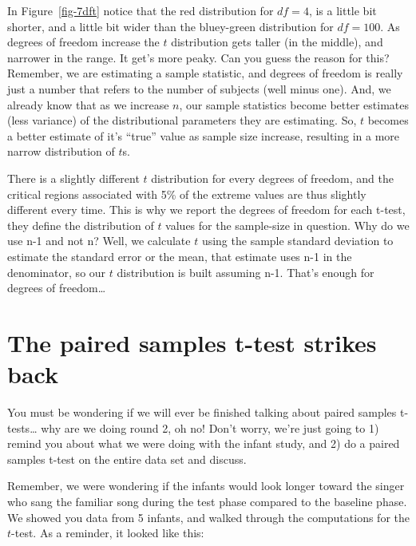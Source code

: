 \documentclass[
  letterpaper,
  DIV=11,
  numbers=noendperiod]{scrreprt}
\begin{document}
In Figure~\ref{fig-7dft} notice that the red distribution for
\(df = 4\), is a little bit shorter, and a little bit wider than the
bluey-green distribution for \(df = 100\). As degrees of freedom
increase the \(t\) distribution gets taller (in the middle), and
narrower in the range. It get's more peaky. Can you guess the reason for
this? Remember, we are estimating a sample statistic, and degrees of
freedom is really just a number that refers to the number of subjects
(well minus one). And, we already know that as we increase \(n\), our
sample statistics become better estimates (less variance) of the
distributional parameters they are estimating. So, \(t\) becomes a
better estimate of it's ``true'' value as sample size increase,
resulting in a more narrow distribution of \(t\)s.

There is a slightly different \(t\) distribution for every degrees of
freedom, and the critical regions associated with 5\% of the extreme
values are thus slightly different every time. This is why we report the
degrees of freedom for each t-test, they define the distribution of
\(t\) values for the sample-size in question. Why do we use n-1 and not
n? Well, we calculate \(t\) using the sample standard deviation to
estimate the standard error or the mean, that estimate uses n-1 in the
denominator, so our \(t\) distribution is built assuming n-1. That's
enough for degrees of freedom\ldots{}

\section{The paired samples t-test strikes
back}\label{the-paired-samples-t-test-strikes-back}

You must be wondering if we will ever be finished talking about paired
samples t-tests\ldots{} why are we doing round 2, oh no! Don't worry,
we're just going to 1) remind you about what we were doing with the
infant study, and 2) do a paired samples t-test on the entire data set
and discuss.

Remember, we were wondering if the infants would look longer toward the
singer who sang the familiar song during the test phase compared to the
baseline phase. We showed you data from 5 infants, and walked through
the computations for the \(t\)-test. As a reminder, it looked like this:
\end{document}
